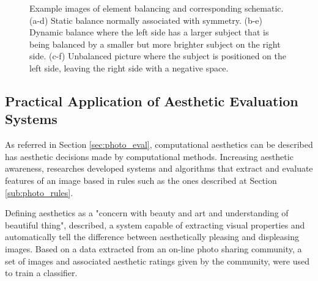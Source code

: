\begin{figure}[htbp]
        \centering
  \caption{Example images of element balancing and corresponding schematic. (a-d) Static balance normally associated with symmetry. (b-e) Dynamic balance where the left side has a larger subject that is being balanced by a smaller but more brighter subject on the right side. (c-f) Unbalanced picture where the subject is positioned on the left side, leaving the right side with a negative space.}
  \label{fig:balance_elements_image}
\end{figure}

\subsection{Practical Application of Aesthetic Evaluation Systems}
\label{sub:eval_applications}

As referred in Section \ref{sec:photo_eval}, computational aesthetics can be described has aesthetic decisions made by computational methods. Increasing aesthetic awareness, researches developed systems and algorithms that extract and evaluate features of an image based in rules such as the ones described at Section \ref{sub:photo_rules}.

Defining aesthetics as a "concern with beauty and art and understanding of beautiful thing", \citeauthor{datta2006studying} \cite{datta2006studying} described, a system capable of extracting visual properties and automatically tell the difference between aesthetically pleasing and displeasing images. 
Based on a data extracted from an on-line photo sharing community, a set of images and associated aesthetic ratings given by the community, were used to train a classifier.

